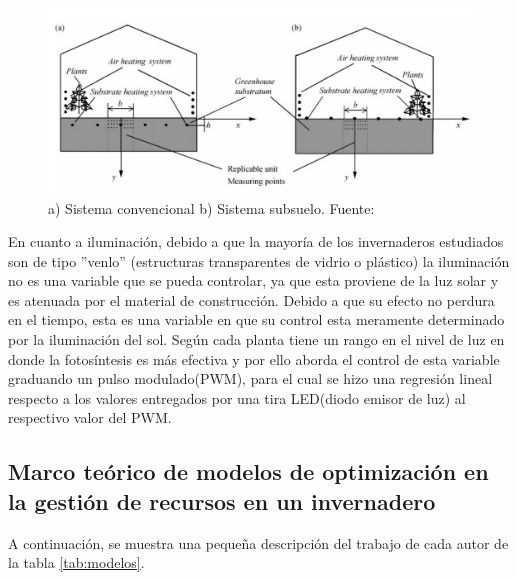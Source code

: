\documentclass[12pt,a4paper]{article}
\begin{document}
		\begin{figure}[h!]
  			\centering
    		\includegraphics[width=\textwidth]{imagenes/heat_pipe.PNG} 
  			\caption{a) Sistema convencional   b) Sistema subsuelo. Fuente:  \parencite{Kurpaska2000}}
  			\label{fig:heat}
		\end{figure}
			
		En cuanto a iluminación, debido a que la mayoría de los invernaderos estudiados son de tipo ''venlo'' (estructuras transparentes de vidrio o plástico) la iluminación no es una variable que se pueda controlar, ya que esta proviene de la luz solar y es atenuada por el material de construcción. Debido a que su efecto no perdura en el tiempo, esta es una variable en que su control esta meramente determinado por la iluminación del sol. Según \parencite{Darko2014} cada planta tiene un rango en el nivel de luz en donde la fotosíntesis es más efectiva y por ello \parencite{VanIersel2017} aborda el control de esta variable graduando un pulso modulado(PWM), para el cual se hizo una regresión lineal respecto a los valores entregados por una tira LED(diodo emisor de luz) al respectivo valor del PWM.
		\newpage
		
\subsection{Marco teórico de modelos de optimización en la gestión de recursos en un invernadero}	
		

A continuación, se muestra una pequeña descripción del trabajo de cada autor de la tabla \ref{tab:modelos}.
	
\end{document}
